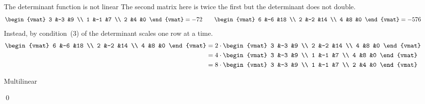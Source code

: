 \documentclass[10pt,t]{beamer}
\begin{document}
\begin{frame}{The determinant function is not linear}
\ex
The second matrix here is twice the first but the determinant does not double.
\begin{equation*}
  \begin{vmat}
    3  &-3  &9 \\
    1  &-1   &7 \\
    2  &4   &0
  \end{vmat}
  =-72
  \qquad
  \begin{vmat}
    6  &-6  &18 \\
    2  &-2   &14 \\
    4  &8   &0
  \end{vmat}
  =-576
\end{equation*}
Instead, by condition~(3) of 
the determinant scales one row at a time.   
\begin{align*}
  \begin{vmat}
    6  &-6  &18 \\
    2  &-2   &14 \\
    4  &8   &0
  \end{vmat}
  &=2\cdot
  \begin{vmat}
    3  &-3  &9 \\
    2  &-2   &14 \\
    4  &8   &0
  \end{vmat}           \\
  &=4\cdot
  \begin{vmat}
    3  &-3  &9 \\
    1  &-1   &7 \\
    4  &8   &0
  \end{vmat}           \\
  &=8\cdot
  \begin{vmat}
    3  &-3  &9 \\
    1  &-1   &7 \\
    2  &4   &0
  \end{vmat}         
\end{align*}
\end{frame}



\begin{frame}{Multilinear}



\pause
\pf
{}

\pause
{}
\end{frame}
\begin{frame}
\end{frame}
\begin{frame}
\qed
\end{frame}
\end{document}
